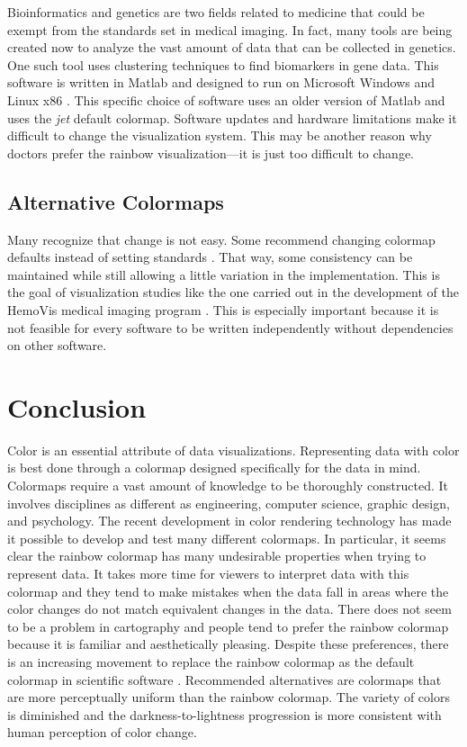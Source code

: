 \documentclass[journal,12pt]{IEEEtran}
\begin{document}
Bioinformatics and genetics are two fields related to medicine that 
could be exempt from the standards set in medical imaging. In fact, many tools
are being created now to analyze the vast amount of data that can be collected
in genetics. One such tool uses clustering techniques to find biomarkers in 
gene data. This software is written in Matlab and designed to run on Microsoft
Windows and Linux x86 \cite{marvis}. This specific choice of software uses an
older version of Matlab and uses the \textit{jet} default colormap. 
Software updates and hardware limitations make it difficult to change 
the visualization system. This may be another reason why doctors prefer
the rainbow visualization---it is just too difficult to change.

\subsection{Alternative Colormaps}

Many recognize that change is not easy. Some recommend changing 
colormap defaults instead of setting standards \cite{viridis}. That way, some 
consistency can be maintained while still allowing a little variation in the
implementation. This is the goal of visualization studies like the one 
carried out in the development of the HemoVis medical imaging program 
\cite{arteryvis}. This is especially important because it is not feasible for
every software to be written independently without dependencies on other
software.

\section{Conclusion}

Color is an essential attribute of data visualizations. Representing data
with color is best done through a colormap designed specifically for the data in
mind.
Colormaps require a vast amount of knowledge to be thoroughly constructed. It 
involves disciplines as different as engineering, computer science, graphic design,
and psychology. The recent development in color rendering technology has made it 
possible to develop and test many different colormaps. In particular, it seems clear
the rainbow colormap has many undesirable properties when trying to represent data.
It takes more time for viewers to interpret data with this colormap and they tend to
make mistakes when the data fall in areas where the color changes do not match 
equivalent changes in the data. There does not seem to be a problem in cartography
and people tend to prefer the rainbow colormap because it is familiar and aesthetically pleasing.
Despite these preferences, there is an increasing movement to replace the rainbow
colormap as the default colormap in scientific software \cite{matlab}. Recommended
alternatives are colormaps that are more perceptually uniform than the rainbow 
colormap. The variety of colors is diminished and the darkness-to-lightness progression
is more consistent with human perception of color change.
\end{document}
